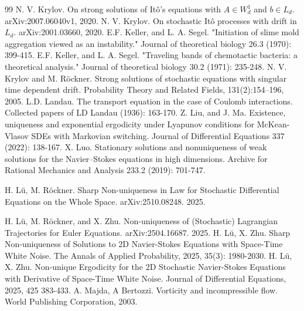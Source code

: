 \documentclass[UTF-8,reqno]{amsart}
\numberwithin{equation}{section}
\theoremstyle{definition}
\begin{document}
\begin{thebibliography}{99}
N. V. Krylov. On strong solutions of It\^o’s equations with $A \in W^1_d$ and $b \in L_d$. arXiv:2007.06040v1, 2020.
N. V. Krylov. On stochastic It\^o processes with drift in $L_d$.  arXiv:2001.03660, 2020.
E.F. Keller, and L. A. Segel. "Initiation of slime mold aggregation viewed as an instability." Journal of theoretical biology 26.3 (1970): 399-415.
E.F. Keller, and L. A. Segel. "Traveling bands of chemotactic bacteria: a theoretical analysis." Journal of theoretical biology 30.2 (1971): 235-248.
N. V. Krylov and M. R\"ockner. Strong solutions of stochastic equations with singular time dependent drift. Probability Theory and Related Fields, 131(2):154–196, 2005.
L.D. Landau. The transport equation in the case of Coulomb interactions. Collected papers of LD Landau (1936): 163-170.
Z. Liu, and J. Ma. Existence, uniqueness and exponential ergodicity under Lyapunov conditions for McKean-Vlasov SDEs with Markovian switching. Journal of Differential Equations 337 (2022): 138-167.
X. Luo. Stationary solutions and nonuniqueness of weak solutions for the Navier–Stokes equations in high dimensions. Archive for Rational Mechanics and Analysis 233.2 (2019): 701-747.
 
H. L\"u, M. R\"ockner. Sharp Non-uniqueness in Law for Stochastic Differential Equations on the Whole Space. arXiv:2510.08248. 2025.

H. L\"u, M. R\"ockner, and  X. Zhu. Non-uniqueness of (Stochastic) Lagrangian Trajectories for Euler Equations. arXiv:2504.16687. 2025.
H. L\"u, X. Zhu. Sharp Non-uniqueness of Solutions to 2D Navier-Stokes Equations with Space-Time White Noise. The Annals of Applied Probability, 2025, 35(3): 1980-2030.
H. L\"u, X. Zhu. Non-unique Ergodicity for the 2D Stochastic Navier-Stokes Equations with Derivative of Space-Time White Noise. Journal of Differential Equations, 2025, 425 383-433.
A. Majda, A Bertozzi. Vorticity and incompressible flow. World Publishing Corporation, 2003.


\end{thebibliography}
\end{document}
